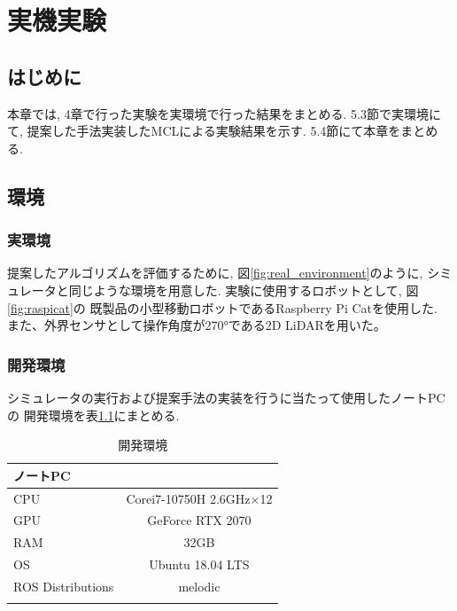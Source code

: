 \chapter{実機実験}\label{chap:practical_experiment}

\section{はじめに}
本章では, 4章で行った実験を実環境で行った結果をまとめる. 
5.3節で実環境にて, 提案した手法実装したMCLによる実験結果を示す. 
5.4節にて本章をまとめる.

\section{環境}

\subsection{実環境}

提案したアルゴリズムを評価するために, 図\ref{fig:real_environment}のように, 
シミュレータと同じような環境を用意した. 実験に使用するロボットとして, 図\ref{fig:raspicat}の
既製品の小型移動ロボットであるRaspberry Pi Catを使用した. 
また、外界センサとして操作角度が270°である2D LiDAR\cite{UST-30LX}を用いた。

\subsection{開発環境}

シミュレータの実行および提案手法の実装を行うに当たって使用したノートPCの
開発環境を表\ref{tabule:pc_spec_real}にまとめる. 

\begin{table}[ht]
  \caption{開発環境}
  \label{tabule:pc_spec_real}
  \begin{center}
    \begin{tabular}{l|c} 
      \thline
      ノートPC & \\
      \hline
      CPU & Corei7-10750H 2.6GHz×12 \\
      GPU & GeForce RTX 2070 \\
      RAM & 32GB \\
      OS & Ubuntu 18.04 LTS \\
      ROS Distributions & melodic \\ 
      \thline
    \end{tabular}
  \end{center}
\end{table}


